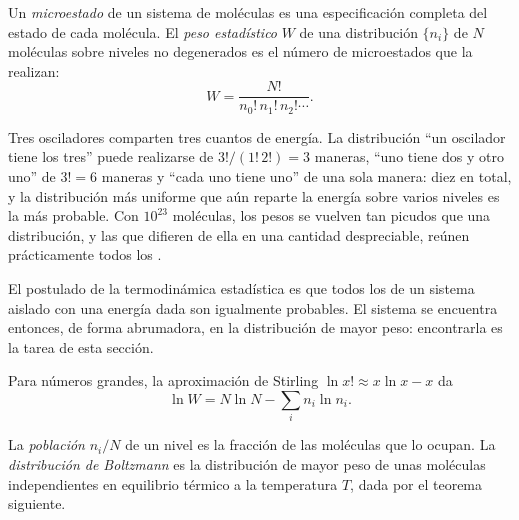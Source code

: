 \begin{definition}\label{def:b3:partition-functions:microstate}
Un \emph{microestado} de un sistema de moléculas es una especificación
completa del estado de cada molécula. El \emph{peso
estadístico} $W$ de una distribución $\{n_i\}$ de $N$ moléculas sobre
niveles no degenerados es el número de microestados que la realizan:
\[
  W = \frac{N!}{n_0!\,n_1!\,n_2!\cdots}.
\]
\end{definition}

\begin{example}\label{ex:b3:partition-functions:three-quanta}
Tres osciladores comparten tres cuantos de energía. La distribución ``un
oscilador tiene los tres'' puede realizarse de $3!/(1!\,2!) = 3$ maneras, ``uno
tiene dos y otro uno'' de $3! = 6$ maneras y ``cada uno tiene uno'' de una sola manera:
diez  en total, y la distribución más uniforme que aún reparte la
energía sobre varios niveles es la más probable. Con $10^{23}$ moléculas, los
pesos se vuelven tan picudos que una distribución, y las que difieren
de ella en una cantidad despreciable, reúnen prácticamente todos los .
\end{example}

\begin{remark}
El postulado de la termodinámica estadística es que todos los  de un
sistema aislado con una energía dada son igualmente probables. El sistema se
encuentra entonces, de forma abrumadora, en la distribución de mayor peso: encontrarla es la
tarea de esta sección.
\end{remark}

Para números grandes, la aproximación de Stirling $\ln x! \approx x\ln x - x$ da
\[
  \ln W = N\ln N - \sum_i n_i\ln n_i .
\]

\begin{definition}\label{def:b3:partition-functions:boltzmann}
La \emph{población} $n_i/N$ de un nivel es la fracción de las
moléculas que lo ocupan. La \emph{distribución de Boltzmann}
es la distribución de mayor peso de unas moléculas independientes en
equilibrio térmico a la temperatura $T$, dada por el teorema siguiente.
\end{definition}

